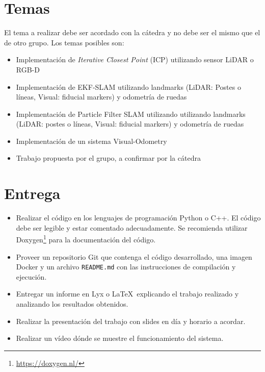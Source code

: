\documentclass[tp]{lcc}
\begin{document}
	\maketitle
	
	
	\section{Temas}
    El tema a realizar debe ser acordado con la cátedra y no debe ser el mismo que el de otro grupo. Los temas posibles son:    
	\begin{itemize}
		
		\item Implementación de \emph{Iterative Closest Point} (ICP) utilizando sensor LiDAR o RGB-D
		\item Implementación de EKF-SLAM utilizando landmarks (LiDAR: Postes o líneas, Visual: fiducial markers) y odometría de ruedas
		\item Implementación de Particle Filter SLAM utilizando utilizando landmarks (LiDAR: postes o líneas, Visual: fiducial markers) y odometría de ruedas
		\item Implementación de un sistema Visual-Odometry
		\item Trabajo propuesta por el grupo, a confirmar por la cátedra
	
	\end{itemize}
		
	\section{Entrega}
	\begin{itemize}
		
		\item Realizar el código en los lenguajes de programación Python o C++. El código debe ser legible y estar comentado adecuadamente. Se recomienda utilizar Doxygen\footnote{\url{https://doxygen.nl/}} para la documentación del código.
		
		\item Proveer un repositorio Git que contenga el código desarrollado, una imagen Docker y un archivo \lstinline{README.md} con las instrucciones de compilación y ejecución.
		
		\item Entregar un informe en Lyx o \LaTeX\  explicando el trabajo realizado y analizando los resultados obtenidos.
		
		\item Realizar la presentación del trabajo con slides en día y horario a acordar.
        
        \item Realizar un vídeo dónde se muestre el funcionamiento del sistema.         
	\end{itemize}
\end{document}
